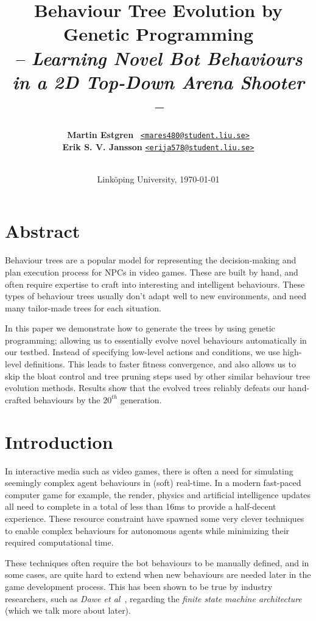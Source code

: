 \documentclass[a4paper, twocolumn]{article}
\title{\textbf{Behaviour Tree Evolution by Genetic Programming}\\
       \Large{\emph{-- Learning Novel Bot Behaviours in a 2D Top-Down Arena Shooter --}}}
\date{Linköping University, \today}
\author{{\textbf{Martin Estgren}} \;\;\;\;\;\;\;\;\;\, {\href{mailto:mares480@student.liu.se}
                                                       {\texttt{<mares480@student.liu.se>}}} \\
        {\textbf{Erik S. V. Jansson}} \;\;\;\;         {\href{mailto:erija578@student.liu.se}
                                                       {\texttt{<erija578@student.liu.se>}}} \\~\\
        \vspace{-5.0ex}}
\begin{document}
    \maketitle
    \section*{Abstract}

    Behaviour trees are a popular model for representing the decision-making and plan execution process for NPCs in video games. These are built by hand, and often require expertise to craft into interesting and intelligent behaviours. These types of behaviour trees usually don't adapt well to new environments, and need many tailor-made trees for each situation.

    In this paper we demonstrate how to generate the trees by using genetic programming; allowing us to essentially evolve novel behaviours automatically in our testbed. Instead of specifying low-level actions and conditions, we use high-level definitions. This leads to faster fitness convergence, and also allows us to skip the bloat control and tree pruning steps used by other similar behaviour tree evolution methods. Results show that the evolved trees reliably defeats our hand-crafted behaviours by the \(20^{th}\) generation.

    \vspace{1em}

    \begingroup
    \def\addvspace#1{}
    \tableofcontents
    \endgroup

    \section{Introduction} \label{sec:introduction}

    In interactive media such as video games, there is often a need for simulating seemingly complex agent behaviours in (soft) real-time. In a modern fast-paced computer game for example, the render, physics and artificial intelligence updates all need to complete in a total of less than 16ms to provide a half-decent experience. These resource constraint have spawned some very clever techniques to enable complex behaviours for autonomous agents while minimizing their required computational time.

    These techniques often require the bot behaviours to be manually defined, and in some cases, are quite hard to extend when new behaviours are needed later in the game development process. This has been shown to be true by industry researchers, such as \emph{Dawe et al}~\cite{dawe2014overview}, regarding the \emph{finite state machine architecture} (which we talk more about later).
\end{document}
